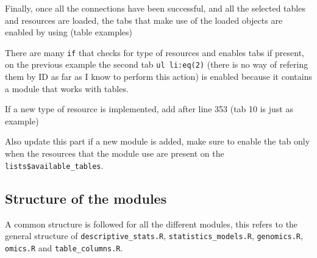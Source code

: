\documentclass[
]{book}
\newenvironment{Shaded}{\begin{snugshade}}{\end{snugshade}}
\newcommand{\AttributeTok}[1]{\textcolor[rgb]{0.77,0.63,0.00}{#1}}
\newcommand{\ControlFlowTok}[1]{\textcolor[rgb]{0.13,0.29,0.53}{\textbf{#1}}}
\newcommand{\FunctionTok}[1]{\textcolor[rgb]{0.00,0.00,0.00}{#1}}
\newcommand{\NormalTok}[1]{#1}
\newcommand{\SpecialCharTok}[1]{\textcolor[rgb]{0.00,0.00,0.00}{#1}}
\newcommand{\StringTok}[1]{\textcolor[rgb]{0.31,0.60,0.02}{#1}}
\begin{document}
Finally, once all the connections have been successful, and all the selected tables and resources are loaded, the tabs that make use of the loaded objects are enabled by using (table examples)

\begin{Shaded}
\end{Shaded}

There are many \texttt{if} that checks for type of resources and enables tabs if present, on the previous example the second tab \texttt{ul\ li:eq(2)} (there is no way of refering them by ID as far as I know to perform this action) is enabled because it contains a module that works with tables.

If a new type of resource is implemented, add after line 353 (tab 10 is just as example)

\begin{Shaded}
\end{Shaded}

Also update this part if a new module is added, make sure to enable the tab only when the resources that the module use are present on the \texttt{lists\$available\_tables}.

\hypertarget{structure-of-the-modules}{%
\subsection{Structure of the modules}\label{structure-of-the-modules}}

A common structure is followed for all the different modules, this refers to the general structure of \texttt{descriptive\_stats.R}, \texttt{statistics\_models.R}, \texttt{genomics.R}, \texttt{omics.R} and \texttt{table\_columns.R}.
\end{document}
